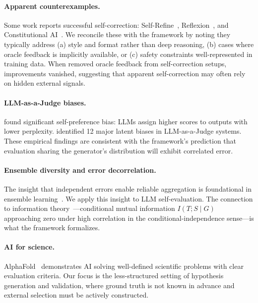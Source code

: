 \documentclass[11pt]{article}
\begin{document}
\paragraph{Apparent counterexamples.} Some work reports successful self-correction: Self-Refine~\citep{madaan2023selfrefine}, Reflexion~\citep{shinn2023reflexion}, and Constitutional AI~\citep{bai2022constitutional}. We reconcile these with the framework by noting they typically address (a) style and format rather than deep reasoning, (b) cases where oracle feedback is implicitly available, or (c) safety constraints well-represented in training data. When \citet{huang2024selfcorrect} removed oracle feedback from self-correction setups, improvements vanished, suggesting that apparent self-correction may often rely on hidden external signals.

\paragraph{LLM-as-a-Judge biases.} \citet{panickssery2024selfpreference} found significant self-preference bias: LLMs assign higher scores to outputs with lower perplexity. \citet{li2024llmjudgebias} identified 12 major latent biases in LLM-as-a-Judge systems. These empirical findings are consistent with the framework's prediction that evaluation sharing the generator's distribution will exhibit correlated error.

\paragraph{Ensemble diversity and error decorrelation.} The insight that independent errors enable reliable aggregation is foundational in ensemble learning~\citep{krogh1995ensemble}. We apply this insight to LLM self-evaluation. The connection to information theory~\citep{cover2006elements}---conditional mutual information $I(T; S \mid G)$ approaching zero under high correlation in the conditional-independence sense---is what the framework formalizes.

\paragraph{AI for science.} AlphaFold~\citep{alphafold} demonstrates AI solving well-defined scientific problems with clear evaluation criteria. Our focus is the less-structured setting of hypothesis generation and validation, where ground truth is not known in advance and external selection must be actively constructed.
\end{document}
